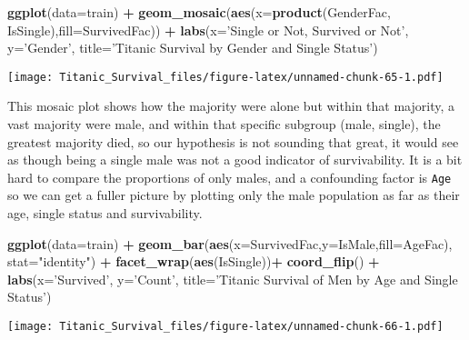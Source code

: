 \documentclass[]{article}
\newenvironment{Shaded}{\begin{snugshade}}{\end{snugshade}}
\newcommand{\KeywordTok}[1]{\textcolor[rgb]{0.13,0.29,0.53}{\textbf{#1}}}
\newcommand{\DataTypeTok}[1]{\textcolor[rgb]{0.13,0.29,0.53}{#1}}
\newcommand{\StringTok}[1]{\textcolor[rgb]{0.31,0.60,0.02}{#1}}
\newcommand{\OperatorTok}[1]{\textcolor[rgb]{0.81,0.36,0.00}{\textbf{#1}}}
\newcommand{\NormalTok}[1]{#1}
\begin{document}
\begin{Shaded}
\begin{Highlighting}[]
\KeywordTok{ggplot}\NormalTok{(}\DataTypeTok{data=}\NormalTok{train) }\OperatorTok{+}
\StringTok{   }\KeywordTok{geom_mosaic}\NormalTok{(}\KeywordTok{aes}\NormalTok{(}\DataTypeTok{x=}\KeywordTok{product}\NormalTok{(GenderFac, IsSingle),}\DataTypeTok{fill=}\NormalTok{SurvivedFac)) }\OperatorTok{+}
\StringTok{   }\KeywordTok{labs}\NormalTok{(}\DataTypeTok{x=}\StringTok{'Single or Not, Survived or Not'}\NormalTok{, }\DataTypeTok{y=}\StringTok{'Gender'}\NormalTok{, }
   \DataTypeTok{title=}\StringTok{'Titanic Survival by Gender and Single Status'}\NormalTok{)}
\end{Highlighting}
\end{Shaded}

\texttt{[image: Titanic\_Survival\_files/figure-latex/unnamed-chunk-65-1.pdf]}

This mosaic plot shows how the majority were alone but within that
majority, a vast majority were male, and within that specific subgroup
(male, single), the greatest majority died, so our hypothesis is not
sounding that great, it would see as though being a single male was not
a good indicator of survivability. It is a bit hard to compare the
proportions of only males, and a confounding factor is \texttt{Age} so
we can get a fuller picture by plotting only the male population as far
as their age, single status and survivability.

\begin{Shaded}
\begin{Highlighting}[]
\KeywordTok{ggplot}\NormalTok{(}\DataTypeTok{data=}\NormalTok{train) }\OperatorTok{+}
\StringTok{   }\KeywordTok{geom_bar}\NormalTok{(}\KeywordTok{aes}\NormalTok{(}\DataTypeTok{x=}\NormalTok{SurvivedFac,}\DataTypeTok{y=}\NormalTok{IsMale,}\DataTypeTok{fill=}\NormalTok{AgeFac), }\DataTypeTok{stat=}\StringTok{"identity"}\NormalTok{) }\OperatorTok{+}
\StringTok{   }\KeywordTok{facet_wrap}\NormalTok{(}\KeywordTok{aes}\NormalTok{(IsSingle))}\OperatorTok{+}
\StringTok{           }\KeywordTok{coord_flip}\NormalTok{() }\OperatorTok{+}
\StringTok{   }\KeywordTok{labs}\NormalTok{(}\DataTypeTok{x=}\StringTok{'Survived'}\NormalTok{, }\DataTypeTok{y=}\StringTok{'Count'}\NormalTok{, }
   \DataTypeTok{title=}\StringTok{'Titanic Survival of Men by Age and Single Status'}\NormalTok{)}
\end{Highlighting}
\end{Shaded}

\texttt{[image: Titanic\_Survival\_files/figure-latex/unnamed-chunk-66-1.pdf]}
\end{document}
